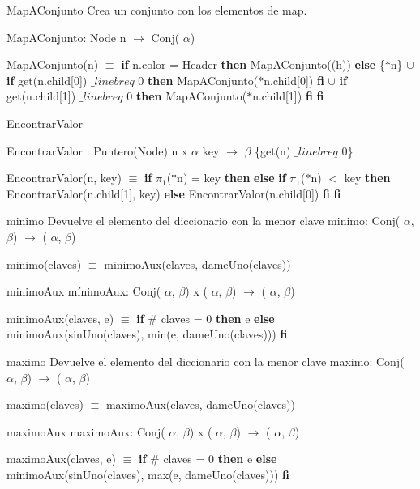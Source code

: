 \begin{DoxyParagraph}{\-Map\-A\-Conjunto}
\-Crea un conjunto con los elementos de map.
\end{DoxyParagraph}
\-Map\-A\-Conjunto\-: \-Node n $\to$ \-Conj( $\alpha$)\par
 \-Map\-A\-Conjunto(n) $\equiv$ {\bfseries if} n.\-color = \-Header {\bfseries then} \-Map\-A\-Conjunto((h)) {\bfseries else} \{$\ast$n\} $\cup$ {\bfseries if} get(n.\-child\mbox{[}0\mbox{]}) $\_linebr eq$ 0 {\bfseries then} \-Map\-A\-Conjunto($\ast$n.child\mbox{[}0\mbox{]}) {\bfseries fi} $\cup$ {\bfseries if} get(n.\-child\mbox{[}1\mbox{]}) $\_linebr eq$ 0 {\bfseries then} \-Map\-A\-Conjunto($\ast$n.child\mbox{[}1\mbox{]}) {\bfseries fi} {\bfseries fi} 

\begin{DoxyParagraph}{\-Encontrar\-Valor}

\end{DoxyParagraph}
\-Encontrar\-Valor \-: \-Puntero(\-Node) n x $\alpha$ key $\to$ $\beta$ \{get(n) $\_linebr eq$ 0\}\par
 \-Encontrar\-Valor(n, key) $\equiv$ {\bfseries if} $\pi_1$($\ast$n) = key {\bfseries then}  {\bfseries else} {\bfseries if} $\pi_1$($\ast$n) $<$ key {\bfseries then} \-Encontrar\-Valor(n.\-child\mbox{[}1\mbox{]}, key) {\bfseries else} \-Encontrar\-Valor(n.\-child\mbox{[}0\mbox{]}) {\bfseries fi} {\bfseries fi} 

\begin{DoxyParagraph}{minimo}
\-Devuelve el elemento del diccionario con la menor clave minimo\-: \-Conj( $\alpha$, $\beta$) $\to$ ( $\alpha$, $\beta$)\par
 minimo(claves) $\equiv$ minimo\-Aux(claves, dame\-Uno(claves)) 
\end{DoxyParagraph}
\begin{DoxyParagraph}{minimo\-Aux}
mínimo\-Aux\-: \-Conj( $\alpha$, $\beta$) x ( $\alpha$, $\beta$) $\to$ ( $\alpha$, $\beta$)\par
 minimo\-Aux(claves, e) $\equiv$ {\bfseries if} \# claves = 0 {\bfseries then} e {\bfseries else} minimo\-Aux(sin\-Uno(claves), min(e, dame\-Uno(claves))) {\bfseries fi} 
\end{DoxyParagraph}
\begin{DoxyParagraph}{maximo}
\-Devuelve el elemento del diccionario con la menor clave maximo\-: \-Conj( $\alpha$, $\beta$) $\to$ ( $\alpha$, $\beta$)\par
 maximo(claves) $\equiv$ maximo\-Aux(claves, dame\-Uno(claves)) 
\end{DoxyParagraph}
\begin{DoxyParagraph}{maximo\-Aux}
maximo\-Aux\-: \-Conj( $\alpha$, $\beta$) x ( $\alpha$, $\beta$) $\to$ ( $\alpha$, $\beta$)\par
 maximo\-Aux(claves, e) $\equiv$ {\bfseries if} \# claves = 0 {\bfseries then} e {\bfseries else} minimo\-Aux(sin\-Uno(claves), max(e, dame\-Uno(claves))) {\bfseries fi}  
\end{DoxyParagraph}
